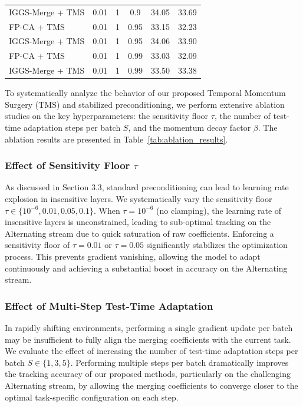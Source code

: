 \documentclass{article}
\theoremstyle{plain}
\theoremstyle{definition}
\theoremstyle{remark}
\begin{document}
\begin{table}[t]
\begin{center}
\begin{small}
\begin{sc}
\begin{tabular}{lccccc}
IGGS-Merge + TMS & 0.01 & 1 & 0.9 & 34.05 & 33.69 \\
FP-CA + TMS & 0.01 & 1 & 0.95 & 33.15 & 32.23 \\
IGGS-Merge + TMS & 0.01 & 1 & 0.95 & 34.06 & 33.90 \\
FP-CA + TMS & 0.01 & 1 & 0.99 & 33.03 & 32.09 \\
IGGS-Merge + TMS & 0.01 & 1 & 0.99 & 33.50 & 33.38 \\
\bottomrule
\end{tabular}
\end{sc}
\end{small}
\end{center}
\vskip -0.1in
\end{table}

To systematically analyze the behavior of our proposed Temporal Momentum Surgery (TMS) and stabilized preconditioning, we perform extensive ablation studies on the key hyperparameters: the sensitivity floor $\tau$, the number of test-time adaptation steps per batch $S$, and the momentum decay factor $\beta$. The ablation results are presented in Table~\ref{tab:ablation_results}.

\subsubsection{Effect of Sensitivity Floor $\tau$}
As discussed in Section 3.3, standard preconditioning can lead to learning rate explosion in insensitive layers. We systematically vary the sensitivity floor $\tau \in \{10^{-6}, 0.01, 0.05, 0.1\}$. 
When $\tau = 10^{-6}$ (no clamping), the learning rate of insensitive layers is unconstrained, leading to sub-optimal tracking on the Alternating stream due to quick saturation of raw coefficients. Enforcing a sensitivity floor of $\tau = 0.01$ or $\tau = 0.05$ significantly stabilizes the optimization process. This prevents gradient vanishing, allowing the model to adapt continuously and achieving a substantial boost in accuracy on the Alternating stream.

\subsubsection{Effect of Multi-Step Test-Time Adaptation}
In rapidly shifting environments, performing a single gradient update per batch may be insufficient to fully align the merging coefficients with the current task. We evaluate the effect of increasing the number of test-time adaptation steps per batch $S \in \{1, 3, 5\}$. Performing multiple steps per batch dramatically improves the tracking accuracy of our proposed methods, particularly on the challenging Alternating stream, by allowing the merging coefficients to converge closer to the optimal task-specific configuration on each step.
\end{document}
